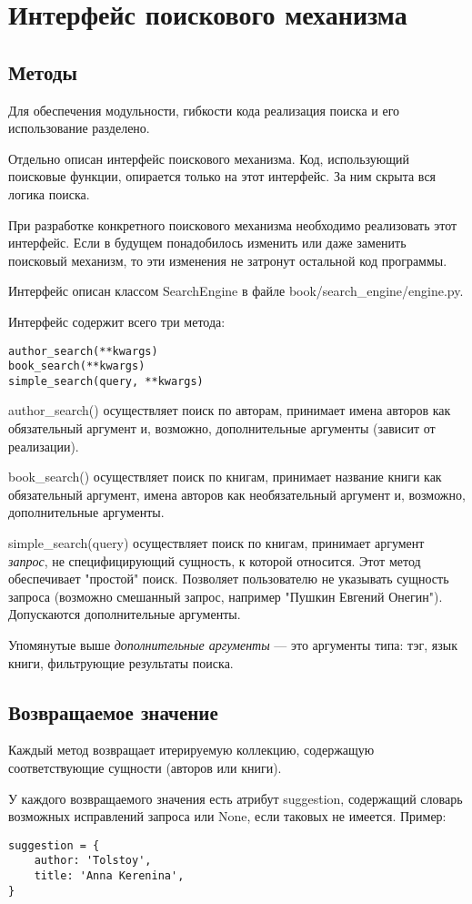 \section{Интерфейс поискового механизма}

\subsection{Методы}


Для обеспечения модульности, гибкости кода реализация поиска и его использование разделено.

Отдельно описан интерфейс поискового механизма. Код, использующий поисковые функции, опирается только на этот интерфейс. За ним скрыта вся логика поиска.

При разработке конкретного поискового механизма необходимо реализовать этот интерфейс. Если в будущем понадобилось изменить или даже заменить поисковый механизм, то эти изменения не затронут остальной код программы.

Интерфейс описан классом SearchEngine в файле book/search\_engine/engine.py. 

Интерфейс содержит всего три метода:
\begin{verbatim}
author_search(**kwargs)
book_search(**kwargs)
simple_search(query, **kwargs)
\end{verbatim}


author\_search() осуществляет поиск по авторам, принимает имена авторов как обязательный аргумент и, возможно, дополнительные аргументы (зависит от реализации).

book\_search() осуществляет поиск по книгам, принимает название книги как обязательный аргумент, имена авторов как необязательный аргумент и, возможно, дополнительные аргументы. 

simple\_search(query) осуществляет поиск по книгам, принимает аргумент {\em запрос}, не специфицирующий сущность, к которой относится.
Этот метод обеспечивает "простой" поиск.
Позволяет пользователю не указывать сущность запроса (возможно смешанный запрос, например "Пушкин Евгений Онегин"). Допускаются дополнительные аргументы. 

Упомянутые выше {\em дополнительные аргументы} --- это аргументы типа: тэг, язык книги, фильтрующие результаты поиска. 


\subsection{Возвращаемое значение}

Каждый метод возвращает итерируемую коллекцию, содержащую соответствующие сущности (авторов или книги). 

У каждого возвращаемого значения есть атрибут suggestion, содержащий словарь возможных исправлений запроса или None, если таковых не имеется. Пример: 
\begin{verbatim}
suggestion = {
    author: 'Tolstoy',
    title: 'Anna Kerenina',
}
\end{verbatim}
